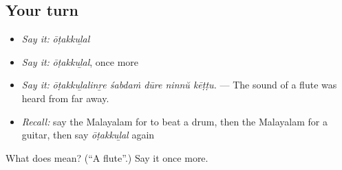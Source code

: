\subsection*{Your turn}
\begin{itemize}
\raggedright
  \item \emph{Say it:} \emph{ōṭakkuḻal}
  \item \emph{Say it:} \emph{ōṭakkuḻal}, once more
  \item \emph{Say it:} \emph{ōṭakkuḻalinṟe śabdaṁ dūre ninnŭ kēṭṭu.} — The sound of a flute was heard from far away.
  \item \emph{Recall:} say the Malayalam for to beat a drum, then the Malayalam for a guitar, then say \emph{ōṭakkuḻal} again
\end{itemize}

\begin{tcolorbox}[breakable,colback=teal!4,colframe=teal!35!black,title={Before you move on}]
What does  mean? (\textquotedblleft{}A flute\textquotedblright{}.) Say it once more.
\end{tcolorbox}
